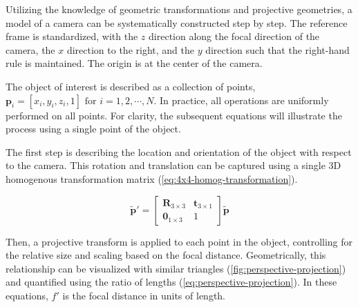 Utilizing the knowledge of geometric transformations and projective geometries, a model of a camera can be systematically constructed step by step.
The reference frame is standardized, with the $z$ direction along the focal direction of the camera, the $x$ direction to the right, and the $y$ direction such that the right-hand rule is maintained.
The origin is at the center of the camera.

The object of interest is described as a collection of points, $\mathbf{p}_i =  [x_i, y_i, z_i, 1] \text{ for } i = 1,2,\cdots,N$.
In practice, all operations are uniformly performed on all points.
For clarity, the subsequent equations will illustrate the process using a single point of the object.

The first step is describing the location and orientation of the object with respect to the camera.
This rotation and translation can be captured using a single 3D homogenous transformation matrix (\cref{eq:4x4-homog-transformation}).

\begin{equation}
    \tilde{\mathbf{p}}' = \begin{bmatrix}
        \mathbf{R}_{3 \times 3} & \mathbf{t}_{3 \times 1} \\ \mathbf{0}_{1 \times 3} & 1
    \end{bmatrix} \tilde{\mathbf{p}}
    \label{eq:4x4-homog-transformation}
\end{equation}

Then, a projective transform is applied to each point in the object, controlling for the relative size and scaling based on the focal distance.
Geometrically, this relationship can be visualized with similar triangles (\cref{fig:perspective-projection}) and quantified using the ratio of lengths (\cref{eq:perspective-projection}).
In these equations, $f'$ is the focal distance in units of length.


